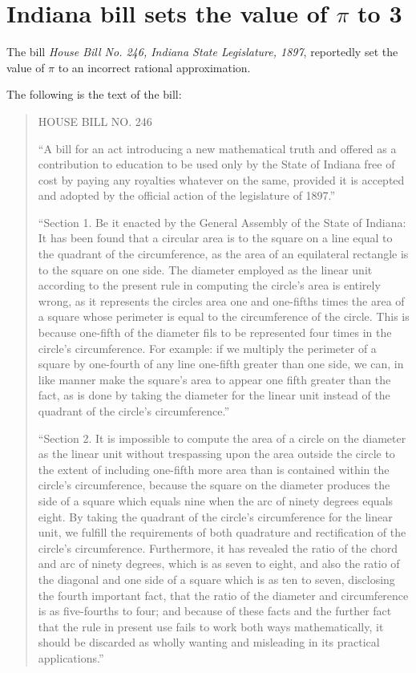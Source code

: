 \section{Indiana bill sets the value of $\pi$ to 3}


The bill {\it House Bill No. 246, Indiana State Legislature, 1897},
reportedly set the value of $\pi$ to an incorrect rational
approximation.

The following is the text of the bill:

\begin{quote}
  HOUSE BILL NO. 246


  ``A bill for an act introducing a new mathematical truth and offered
  as a contribution to education to be used only by the State of Indiana
  free of cost by paying any royalties whatever on the same, provided it
  is accepted and adopted by the official action of the legislature of
  1897.''

  ``Section 1. Be it enacted by the General Assembly of the State of
  Indiana: It has been found that a circular area is to the square on a
  line equal to the quadrant of the circumference, as the area of an
  equilateral rectangle is to the square on one side. The diameter
  employed as the linear unit according to the present rule in computing
  the circle's area is entirely wrong, as it represents the circles area
  one and one-fifths times the area of a square whose perimeter is equal
  to the circumference of the circle. This is because one-fifth of the
  diameter fils to be represented four times in the circle's
  circumference. For example: if we multiply the perimeter of a square
  by one-fourth of any line one-fifth greater than one side, we can, in
  like manner make the square's area to appear one fifth greater than
  the fact, as is done by taking the diameter for the linear unit
  instead of the quadrant of the circle's circumference.''

  ``Section 2. It is impossible to compute the area of a circle on the
  diameter as the linear unit without trespassing upon the area outside
  the circle to the extent of including one-fifth more area than is
  contained within the circle's circumference, because the square on the
  diameter produces the side of a square which equals nine when the arc
  of ninety degrees equals eight. By taking the quadrant of the circle's
  circumference for the linear unit, we fulfill the requirements of both
  quadrature and rectification of the circle's
  circumference. Furthermore, it has revealed the ratio of the chord and
  arc of ninety degrees, which is as seven to eight, and also the ratio
  of the diagonal and one side of a square which is as ten to seven,
  disclosing the fourth important fact, that the ratio of the diameter
  and circumference is as five-fourths to four; and because of these
  facts and the further fact that the rule in present use fails to work
  both ways mathematically, it should be discarded as wholly wanting and
  misleading in its practical applications.''



\end{quote}
